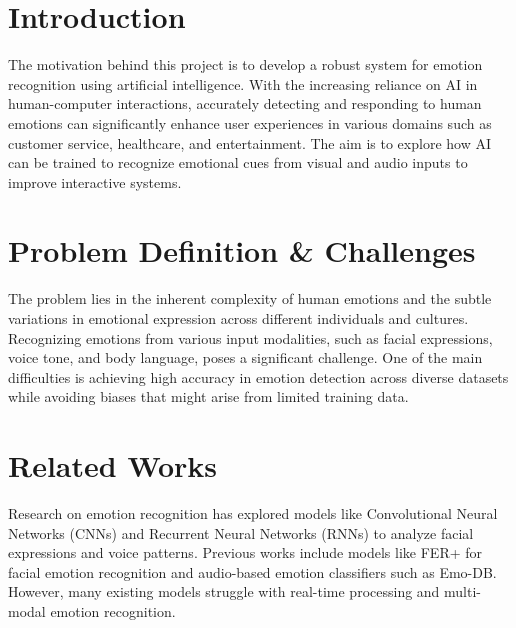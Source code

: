 \documentclass{article}
\begin{document}


\section{Introduction}
The motivation behind this project is to develop a robust system for emotion recognition using artificial intelligence. With the increasing reliance on AI in human-computer interactions, accurately detecting and responding to human emotions can significantly enhance user experiences in various domains such as customer service, healthcare, and entertainment. The aim is to explore how AI can be trained to recognize emotional cues from visual and audio inputs to improve interactive systems.

\section{Problem Definition \& Challenges}
The problem lies in the inherent complexity of human emotions and the subtle variations in emotional expression across different individuals and cultures. Recognizing emotions from various input modalities, such as facial expressions, voice tone, and body language, poses a significant challenge. One of the main difficulties is achieving high accuracy in emotion detection across diverse datasets while avoiding biases that might arise from limited training data.

\section{Related Works}
Research on emotion recognition has explored models like Convolutional Neural Networks (CNNs) and Recurrent Neural Networks (RNNs) to analyze facial expressions and voice patterns. Previous works include models like FER+ for facial emotion recognition and audio-based emotion classifiers such as Emo-DB. However, many existing models struggle with real-time processing and multi-modal emotion recognition.
\end{document}
